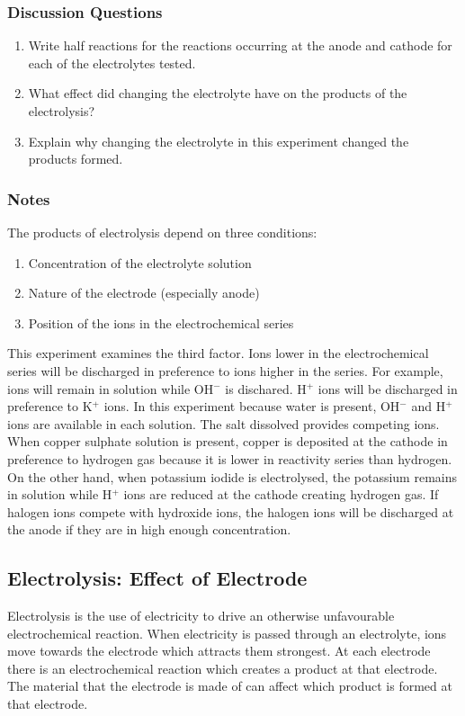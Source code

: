 \subsubsection*{Discussion Questions}
\begin{enumerate}
\item{Write half reactions for the reactions occurring at the anode and cathode for each of the electrolytes tested.}
\item{What effect did changing the electrolyte have on the products of the electrolysis?}
\item{Explain why changing the electrolyte in this experiment changed the products formed.}
\end{enumerate}

\subsubsection*{Notes}
The products of electrolysis depend on three conditions:
\begin{enumerate}
\item Concentration of the electrolyte solution
\item Nature of the electrode (especially anode)
\item Position of the ions in the electrochemical series
\end{enumerate}
This experiment examines the third factor. Ions lower in the electrochemical series will be discharged in preference to ions higher in the series. For example,  ions will remain in solution while OH$^{-}$ is dischared. H$^{+}$ ions will be discharged in preference to K$^{+}$ ions.
In this experiment because water is present, OH$^{-}$ and H$^{+}$ ions are available in each solution. The salt dissolved provides competing ions. When copper sulphate solution is present, copper is deposited at the cathode in preference to hydrogen gas because it is lower in reactivity series than hydrogen. On the other hand, when potassium iodide is electrolysed, the potassium remains in solution while H$^{+}$ ions are reduced at the cathode creating hydrogen gas.
If halogen ions compete with hydroxide ions, the halogen ions will be discharged at the anode if they are in high enough concentration.

\subsection{Electrolysis: Effect of Electrode}

Electrolysis is the use of electricity to drive an otherwise unfavourable electrochemical reaction. When electricity is passed through an electrolyte, ions move towards the electrode which attracts them strongest. At each electrode there is an electrochemical reaction which creates a product at that electrode. The material that the electrode is made of can affect which product is formed at that electrode.

